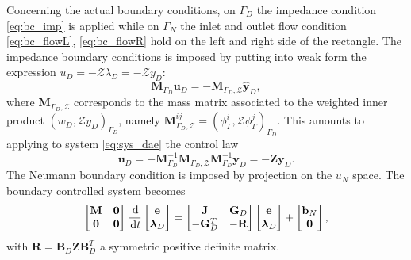 \documentclass{ifacconf}
\begin{document}
Concerning the actual boundary conditions, on $\Gamma_D$ the impedance condition \eqref{eq:bc_imp} is applied while on  $\Gamma_N$ the inlet and outlet flow condition \eqref{eq:bc_flowL}, \eqref{eq:bc_flowR} hold on the left and right side of the rectangle. The impedance boundary conditions is imposed by putting into weak form the expression $u_D=-\mathcal{Z}\lambda_D=-\mathcal{Z}y_D$:
\[ \mathbf{M}_{\Gamma_D} \mathbf{u}_D = - \mathbf{M}_{\Gamma_D, \mathcal{Z}} \widehat{\mathbf{y}}_D,
\]
where $\mathbf{M}_{\Gamma_D, \mathcal{Z}}$ corresponds to the mass matrix associated to the weighted inner product $\left(w_D, \mathcal{Z}  y_D\right)_{\Gamma_D}$, namely $\mathbf{M}_{\Gamma_D, \mathcal{Z}}^{ij} = \left(\phi_\Gamma^i, \mathcal{Z}  \phi_\Gamma^j \right)_{\Gamma_D}$. This amounts to applying to system \eqref{eq:sys_dae} the control law
\[ \mathbf{u}_D = - \mathbf{M}_{\Gamma_D}^{-1} \mathbf{M}_{\Gamma_D, \mathcal{Z}} \mathbf{M}_{\Gamma_D}^{-1} \mathbf{y}_D = -\mathbf{Z} \mathbf{y}_D.
\]
The Neumann boundary condition is imposed by projection on the $u_N$ space.   The boundary controlled system becomes   
\begin{equation}
\label{eq:sys_dae}
\begin{bmatrix}
\mathbf{M} & \mathbf{0} \\
\mathbf{0} & \mathbf{0} \\
\end{bmatrix} \frac{\,\mathrm{d}}{\,\mathrm{d} t}
\begin{bmatrix}
\mathbf{e}\\
\bm{\lambda}_D \\
\end{bmatrix}
= \begin{bmatrix}
\mathbf{J} & \mathbf{G}_D\\
-\mathbf{G}_D^T & -\mathbf{R} \\
\end{bmatrix}
\begin{bmatrix}
\mathbf{e}\\
\bm{\lambda}_D \\
\end{bmatrix} + \begin{bmatrix}
\mathbf{b}_N \\
\mathbf{0} \\
\end{bmatrix},
\end{equation}
with $\mathbf{R} = \mathbf{B}_D \mathbf{Z} \mathbf{B}_D^T$ a symmetric positive definite matrix. 
\end{document}

